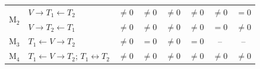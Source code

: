 \documentclass[12pt,letterpaper]{report}
\begin{document}
\begin{table}[H]
\begin{tabular}{c|p{2.8cm}|cccc|cc}
		\multirow{2}{*}{M$_2$} & $V\rightarrow T_1 \leftarrow T_2$ & $\neq0$ & $\neq 0$ & $\neq0$ & $\neq0$ & $\neq0$ & $=0$ \\ 
		
		& \small $V\rightarrow T_2 \leftarrow T_1$ & $\neq0$ & $\neq 0$ & $\neq0$ & $\neq0$ & $=0$ & $\neq 0$ \\  
		\midrule
		\multirow{1}{*}{M$_3$} & \small $T_1 \leftarrow V \rightarrow T_2$ & $\neq 0$ & $= 0$ & $\neq0$ & $=0$ & -- & -- \\  
		\midrule
		\multirow{2}{*}{M$_4$} & \small $T_1 \leftarrow V \rightarrow T_2$; $T_1 \longleftrightarrow T_2$ & $\neq0$ & $\neq 0$ & $\neq0$ & $\neq0$ & $\neq 0$ & $\neq 0$ \\  
		\bottomrule[0.04cm]
	\end{tabular}
\end{table}
\end{document}
